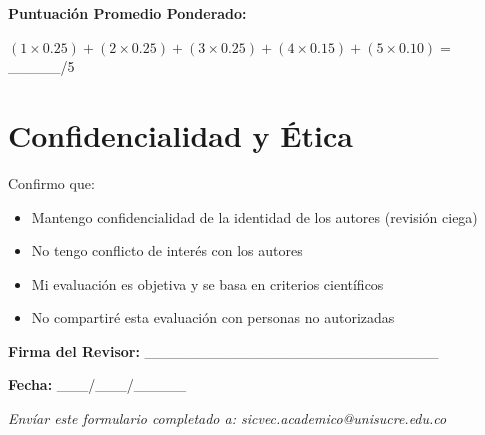 \documentclass[12pt,a4paper]{article}
\begin{document}
\vspace{1cm}

\noindent
\textbf{Puntuación Promedio Ponderado:}

\vspace{0.3cm}

\noindent
$(1 \times 0.25) + (2 \times 0.25) + (3 \times 0.25) + (4 \times 0.15) + (5 \times 0.10) = $ \_\_\_\_\_/5

\vspace{1cm}

\section{Confidencialidad y Ética}

\noindent
Confirmo que:

\begin{itemize}[label={\textcolor{verdeosc}{\checkmark}}]
  \item Mantengo confidencialidad de la identidad de los autores (revisión ciega)
  \item No tengo conflicto de interés con los autores
  \item Mi evaluación es objetiva y se basa en criterios científicos
  \item No compartiré esta evaluación con personas no autorizadas
\end{itemize}

\vspace{1.5cm}

\noindent
\textbf{Firma del Revisor:} \_\_\_\_\_\_\_\_\_\_\_\_\_\_\_\_\_\_\_\_\_\_\_\_\_\_\_\_

\noindent
\textbf{Fecha:} \_\_\_/\_\_\_/\_\_\_\_\_

\vspace{1cm}

\noindent
\textit{\small Envíar este formulario completado a: sicvec.academico@unisucre.edu.co}
\end{document}
